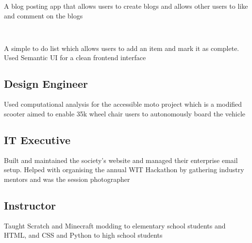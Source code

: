 \documentclass[11pt, a4paper]{TechCV}
\begin{document}
\begin{minipage}[t]{1\textwidth}
A blog posting app that allows users to create blogs and allows other users to like and comment on the blogs
\sectionsep

\\
 
A simple to do list which allows users to add an item and mark it as complete. Used Semantic UI for a clean frontend interface
\sectionsep 

\sectionsep
\subsection{Design Engineer}

\vspace{\topsep} %
Used computational analysis for the accessible moto project which is a modified scooter aimed to enable 35k wheel chair users to autonomously board the vehicle
\sectionsep

\subsection{IT Executive}
\vspace{\topsep} %
Built and maintained the society's website and managed their enterprise email setup. Helped with organising the annual WIT Hackathon by gathering industry mentors and was the session photographer
\sectionsep

\subsection{Instructor}
\vspace{\topsep} %
Taught Scratch and Minecraft modding to elementary school students and HTML, and CSS and Python to high school students
\sectionsep

\end{minipage}
\end{document}
